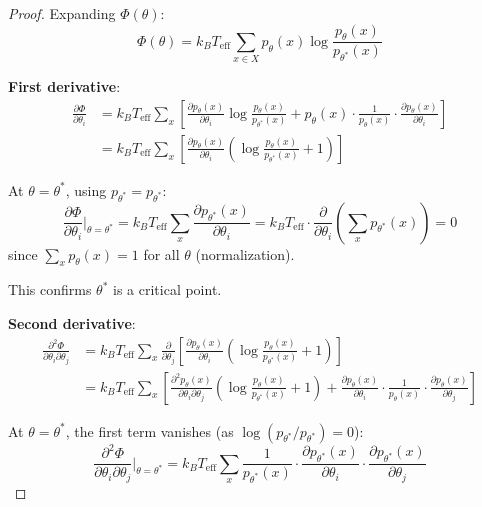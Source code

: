 \documentclass[11pt]{article}
\begin{document}
\begin{proof}
Expanding $\Phi(\theta)$:
\begin{equation}
\Phi(\theta) = k_B T_{\text{eff}} \sum_{x \in X} p_\theta(x) \log \frac{p_\theta(x)}{p_{\theta^*}(x)}
\end{equation}

\textbf{First derivative}:
\begin{align}
\frac{\partial \Phi}{\partial \theta_i}
&= k_B T_{\text{eff}} \sum_{x} \left[ \frac{\partial p_\theta(x)}{\partial \theta_i} \log \frac{p_\theta(x)}{p_{\theta^*}(x)} + p_\theta(x) \cdot \frac{1}{p_\theta(x)} \cdot \frac{\partial p_\theta(x)}{\partial \theta_i} \right] \nonumber \\
&= k_B T_{\text{eff}} \sum_{x} \left[ \frac{\partial p_\theta(x)}{\partial \theta_i} \left( \log \frac{p_\theta(x)}{p_{\theta^*}(x)} + 1 \right) \right]
\end{align}

At $\theta = \theta^*$, using $p_{\theta^*} = p_{\theta^*}$:
\begin{equation}
\frac{\partial \Phi}{\partial \theta_i} \bigg|_{\theta = \theta^*}
= k_B T_{\text{eff}} \sum_{x} \frac{\partial p_{\theta^*}(x)}{\partial \theta_i}
= k_B T_{\text{eff}} \cdot \frac{\partial}{\partial \theta_i} \left( \sum_x p_{\theta^*}(x) \right)
= 0
\end{equation}
since $\sum_x p_\theta(x) = 1$ for all $\theta$ (normalization).

This confirms $\theta^*$ is a critical point.

\textbf{Second derivative}:
\begin{align}
\frac{\partial^2 \Phi}{\partial \theta_i \partial \theta_j}
&= k_B T_{\text{eff}} \sum_{x} \frac{\partial}{\partial \theta_j} \left[ \frac{\partial p_\theta(x)}{\partial \theta_i} \left( \log \frac{p_\theta(x)}{p_{\theta^*}(x)} + 1 \right) \right] \nonumber \\
&= k_B T_{\text{eff}} \sum_{x} \left[ \frac{\partial^2 p_\theta(x)}{\partial \theta_i \partial \theta_j} \left( \log \frac{p_\theta(x)}{p_{\theta^*}(x)} + 1 \right) + \frac{\partial p_\theta(x)}{\partial \theta_i} \cdot \frac{1}{p_\theta(x)} \cdot \frac{\partial p_\theta(x)}{\partial \theta_j} \right]
\end{align}

At $\theta = \theta^*$, the first term vanishes (as $\log(p_{\theta^*}/p_{\theta^*}) = 0$):
\begin{equation}
\frac{\partial^2 \Phi}{\partial \theta_i \partial \theta_j} \bigg|_{\theta = \theta^*}
= k_B T_{\text{eff}} \sum_{x} \frac{1}{p_{\theta^*}(x)} \cdot \frac{\partial p_{\theta^*}(x)}{\partial \theta_i} \cdot \frac{\partial p_{\theta^*}(x)}{\partial \theta_j}
\end{equation}


\end{proof}
\end{document}
